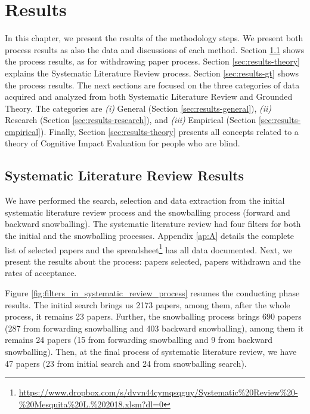 \chapter{Results}
\label{chap:resultados}

In this chapter, we present the results of the methodology steps. We present both process results as also the data and discussions of each method. Section \ref{sec:results-slr} shows the process results, as for withdrawing paper process. Section \ref{sec:results-theory} explains the Systematic Literature Review process. Section \ref{sec:results-gt} shows the process results. The next sections are focused on the three categories of data acquired and analyzed from both Systematic Literature Review and Grounded Theory. The categories are \textit{(i)} General (Section \ref{sec:results-general}), \textit{(ii)} Research (Section \ref{sec:results-research}), and \textit{(iii)} Empirical (Section \ref{sec:results-empirical}). Finally, Section \ref{sec:results-theory} presents all concepts related to a theory of Cognitive Impact Evaluation for people who are blind.

\section{Systematic Literature Review Results}
\label{sec:results-slr}
We have performed the search, selection and data extraction from the initial systematic literature review process and the snowballing process (forward and backward snowballing). The systematic literature review had four filters for both the initial and the snowballing processes. Appendix \ref{ap:A} details the complete list of selected papers and the spreadsheet\footnote{\url{https://www.dropbox.com/s/dvvn44cymqsqguy/Systematic\%20Review\%20-\%20Mesquita\%20L.\%202018.xlsm?dl=0}} has all data documented. Next, we present the results about the process: papers selected, papers withdrawn and the rates of acceptance.

Figure \ref{fig:filters_in_systematic_review_process} resumes the conducting phase results. The initial search brings us 2173 papers, among them, after the whole process, it remains 23 papers. Further, the snowballing process brings 690 papers (287 from forwarding snowballing and 403 backward snowballing), among them it remains 24 papers (15 from forwarding snowballing and 9 from backward snowballing). Then, at the final process of systematic literature review, we have 47 papers (23 from initial search and 24 from snowballing search). 

